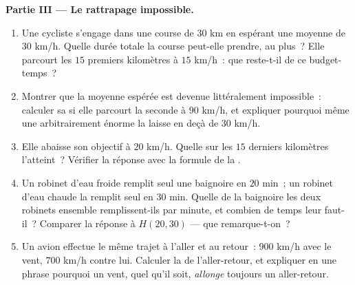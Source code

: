 \begin{problem}
\medskip
\noindent\textbf{Partie III --- Le rattrapage impossible.}
\begin{enumerate}[resume]
  \item Une cycliste s'engage dans une course de $30$ km en
        espérant une moyenne de $30$ km/h. Quelle durée totale la
        course peut-elle prendre, au plus~? Elle parcourt les $15$
        premiers kilomètres à $15$ km/h~: que reste-t-il de ce
        budget-temps~?
  \item Montrer que la moyenne espérée est devenue littéralement
        impossible~: calculer sa  si elle parcourt
        la seconde  à $90$ km/h, et expliquer pourquoi même
        une  arbitrairement énorme la laisse en deçà de
        $30$ km/h.
  \item Elle abaisse son objectif à $20$ km/h. Quelle  sur
        les $15$ derniers kilomètres l'atteint~? Vérifier la
        réponse avec la formule de la .
  \item Un robinet d'eau froide remplit seul une baignoire en
        $20$ min~; un robinet d'eau chaude la remplit seul en
        $30$ min. Quelle  de la baignoire les deux robinets
        ensemble remplissent-ils par minute, et combien de temps
        leur faut-il~? Comparer la réponse à $H(20, 30)$ --- que
        remarque-t-on~?
  \item Un avion effectue le même trajet à l'aller et au retour~:
        $900$ km/h avec le vent, $700$ km/h contre lui. Calculer la
         de l'aller-retour, et expliquer en une
        phrase pourquoi un vent, quel qu'il soit, \emph{allonge}
        toujours un aller-retour.
\end{enumerate}
\end{problem}
